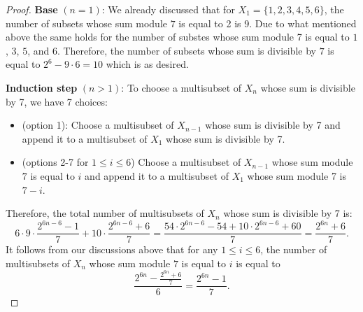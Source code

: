 \begin{solution}
\begin{proof}
\noindent \textbf{Base} $(n=1)$: We already discussed that for $X_1 = \{1,2,3,4,5,6\}$, the number of subsets whose sum module $7$ is equal to 2 is  9. Due to what mentioned above the same holds for the number of substes whose sum module 7 is equal to $1$, $3$, $5$, and $6$. Therefore, the number of subsets whose sum is divisible by $7$ is equal to $2^6-9\cdot 6=10$ which is as desired.

\noindent \textbf{Induction step} $(n>1)$: To choose a multisubset of $X_n$ whose sum is divisible by 7, we have 7 choices:
\begin{itemize}
	\item (option 1): Choose a multisubset of $X_{n-1}$ whose sum is divisible by 7  and append it to a multisubset of $X_1$ whose sum is divisible by 7.
	\item (options 2-7 for $1 \leq i \leq 6$) Choose a multisubset of $X_{n-1}$ whose sum module $7$ is equal to $i$ and append it to a multisubset of $X_1$ whose sum module 7 is $7-i$.
\end{itemize}
Therefore, the total number of multisubsets of $X_n$ whose sum is divisible by 7 is: $$6 \cdot 9 \cdot \frac{2^{6n-6} - 1}{7} + 10 \cdot \frac{2^{6n-6}+6}{7} = \frac{54 \cdot 2^{6n-6} - 54 + 10 \cdot 2^{6n-6} + 60}{7} = \frac{2^{6n} + 6}{7}.$$
It follows from our discussions above that for any $1 \leq i \leq 6$, the number of multisubsets of $X_n$ whose sum module $7$ is equal to $i$ is equal to $$\frac{2^{6n} - \frac{2^{6n}+6}{7}}{6} = \frac{2^{6n}-1}{7}.$$
\end{proof}

\end{solution}
